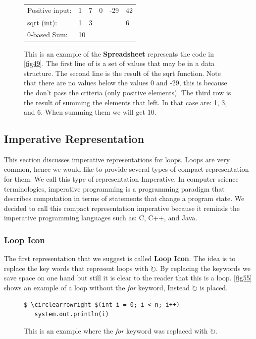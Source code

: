 \begin{figure}[H]
\begin{table}[H]
\centering
\begin{tabular}{llllll}
Positive input: & 1  & 7  & 0 & -29 & 42 \\
sqrt (int):     & 1  & 3  &   &     & 6  \\ \hline
0-based Sum:    & \multicolumn{5}{l}{10} \\
\end{tabular}
\end{table}
\caption{This is an example of the \textbf{Spreadsheet} represents the code in \autoref{fig49}. The first line of is a set of values that may be in a data structure. The second line is the result of the sqrt function. Note that there are no values below the values 0 and -29, this is because the don't pass the criteria (only positive elements). The third row is the result of summing the elements that left. In that case are: 1, 3, and 6. When summing them we will get 10.}
\label{fig54}
\end{figure}
\subsection{Imperative Representation}
This section discusses imperative representations for loops. Loops are very common, hence we would like to provide several types of compact representation for them. We call this type of representation Imperative. In computer science terminologies, imperative programming is a programming paradigm that describes computation in terms of statements that change a program state. We decided to call this compact representation imperative because it reminds the imperative programming languages such as: C, C++, and Java.

\subsubsection{Loop Icon}
The first representation that we suggest is called \textbf{Loop Icon}. The idea is to replace the key words that represent loops with $ \circlearrowright $. By replacing the keywords we save space on one hand but still it is clear to the reader that this is a loop. \autoref{fig55} shows an example of a loop without the \textit{for} keyword, Instead $ \circlearrowright $ is placed.
\begin{figure}[H]
\begin{lstlisting}
$ \circlearrowright $(int i = 0; i < n; i++)
   system.out.println(i)
\end{lstlisting}
\caption{This is an example where the \textit{for} keyword was replaced with $ \circlearrowright $.}
\label{fig55}
\end{figure}
